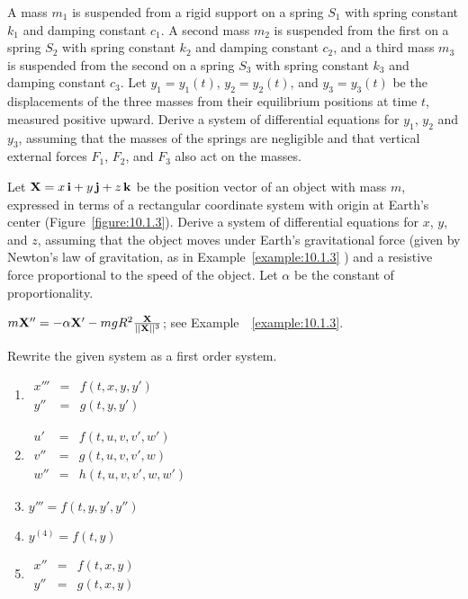 \documentclass{ximera}
\begin{document}
\begin{problem}\label{exer:10.1.3}
A mass $m_1$ is suspended from a rigid support on a spring $S_1$ with
spring constant $k_1$ and damping constant $c_1$. A second mass $m_2$
is suspended from the first on a spring $S_2$ with spring constant
$k_2$ and damping constant $c_2$, and a third mass $m_3$ is suspended
from the second on a spring $S_3$ with spring constant $k_3$ and
damping
constant $c_3$. Let $y_1=y_1(t)$, $y_2=y_2(t)$, and $y_3=y_3(t)$ be the
displacements of the three masses from their equilibrium positions at
time $t$, measured positive upward. Derive a system of differential
equations for $y_1$, $y_2$ and $y_3$, assuming that the masses of the
springs are negligible and that vertical external forces $F_1$, $F_2$,
and
$F_3$ also act on the masses.
\end{problem}

\begin{problem}\label{exer:10.1.4}
Let ${\bf X}=x\,{\bf i}+y\,{\bf j}+z\,{\bf k}$ be the position vector
of an object with mass $m$, expressed in terms of a rectangular
coordinate system with origin at Earth's center
(Figure~\ref{figure:10.1.3}). Derive a system of differential equations for
$x$, $y$, and $z$, assuming that the object moves under Earth's
gravitational force (given by Newton's law of gravitation, as in
Example~\ref{example:10.1.3} ) and a resistive force proportional to the
speed of the object. Let $\alpha$ be the constant of proportionality.

\begin{solution}
    $m{\bf X}''=-\alpha{\bf X'}-mgR^2\frac{{\bf X}}{||{\bf X}||^3}$;
see Example~~\ref{example:10.1.3}.
\end{solution}
\end{problem}



\begin{problem}\label{exer:10.1.5}
 Rewrite the given system as a first order system.

\begin{enumerate}
    \item $\begin{array}{rcl} x''' &=& f(t,x,y,y')\\ 
    y'' &=&g(t,y,y') \end{array}$
    \item $\begin{array}{rcl} u' &=&f(t,u,v,v',w')\\ v''&=&g(t,u,v,v',w)
\\w''&=&h(t,u,v,v',w,w')\end{array}$
\item $y''' =f(t,y,y',y'')$
\item $y^{(4)} = f(t,y)$
\item $\begin{array}{rcl} x'' &=& f(t,x,y)\\ y'' &=&
g(t,x,y) \end{array}$
\end{enumerate}


\end{problem}
\end{document}
